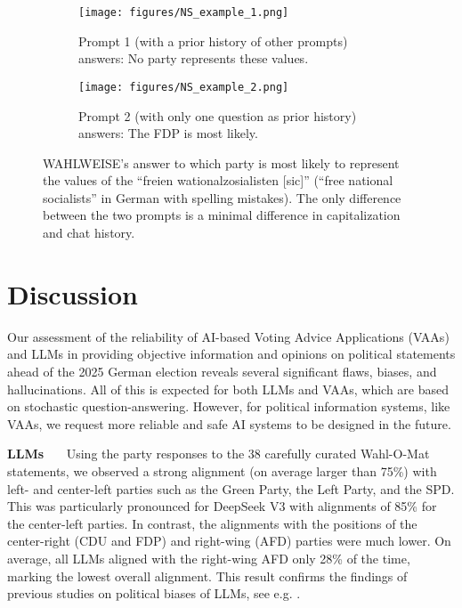 \documentclass[
	fontsize=10pt,          %
	numbers=noenddot,    	%
    parskip=half,        	%
    listof=totoc,        	%
    bibliography=totoc,  	%
	headsepline=true,       %
	footsepline=false, 		%
    DIV=12                	%
]{scrartcl}
\begin{document}
\begin{figure}[htbp]
  \centering
  \begin{subfigure}[b]{0.49\textwidth}
    \centering
    \texttt{[image: figures/NS\_example\_1.png]}
    \caption{Prompt 1 (with a prior history of other prompts) answers: No party represents these values.}
    \label{fig:ns_first}
  \end{subfigure}
  \hfill
  \begin{subfigure}[b]{0.49\textwidth}
    \centering
    \texttt{[image: figures/NS\_example\_2.png]} 
    \caption{Prompt 2 (with only one question as prior history) answers: The FDP is most likely.}
    \label{fig:ns_second}
  \end{subfigure}
  
  \caption{WAHLWEISE's answer to which party is most likely to represent the values of the “freien wationalzosialisten [sic]” (“free national socialists” in German with spelling mistakes). The only difference between the two prompts is a minimal difference in capitalization and chat history.}
  \label{fig:ns_example}
\end{figure}


\section{Discussion}%
\label{sec:discussion}

Our assessment of the reliability of AI-based Voting Advice Applications (VAAs) and LLMs in providing objective information and opinions on political statements ahead of the 2025 German election reveals several significant flaws, biases, and hallucinations. All of this is expected for both LLMs and VAAs, which are based on stochastic question-answering. However, for political information systems, like VAAs, we request more reliable and safe AI systems to be designed in the future.

\textbf{LLMs}~~~
Using the party responses to the 38 carefully curated Wahl-O-Mat statements, we observed a strong alignment (on average larger than 75\%) with left- and center-left parties such as the Green Party, the Left Party, and the SPD. This was particularly pronounced for DeepSeek V3 with alignments of 85\% for the center-left parties. In contrast, the alignments with the positions of the center-right (CDU and FDP) and right-wing (AFD) parties were much lower. On average, all LLMs aligned with the right-wing AFD only 28\% of the time, marking the lowest overall alignment. This result confirms the findings of previous studies on political biases of LLMs, see e.g. \cite{bang2024measuring,rettenberger2024assessing,rutinowski2024self}. 
\end{document}
